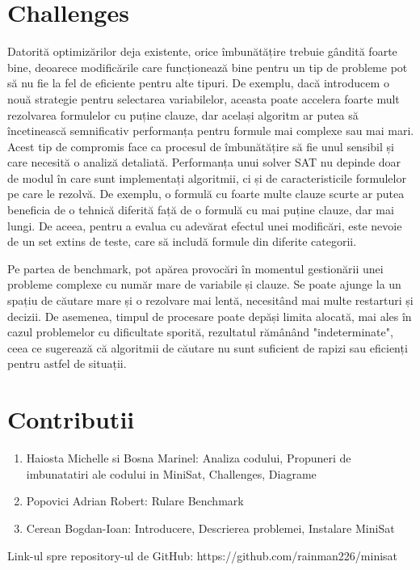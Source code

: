 \documentclass[runningheads]{llncs}
\begin{document}
\section{Challenges}
Datorită optimizărilor deja existente, orice îmbunătățire trebuie gândită foarte bine, deoarece modificările care funcționează bine pentru un tip de probleme pot să nu fie la fel de eficiente pentru alte tipuri. De exemplu, dacă introducem o nouă strategie pentru selectarea variabilelor, aceasta poate accelera foarte mult rezolvarea formulelor cu puține clauze, dar același algoritm ar putea să încetinească semnificativ performanța pentru formule mai complexe sau mai mari. Acest tip de compromis face ca procesul de îmbunătățire să fie unul sensibil și care necesită o analiză detaliată. Performanța unui solver SAT nu depinde doar de modul în care sunt implementați algoritmii, ci și de caracteristicile formulelor pe care le rezolvă. De exemplu, o formulă cu foarte multe clauze scurte ar putea beneficia de o tehnică diferită față de o formulă cu mai puține clauze, dar mai lungi. De aceea, pentru a evalua cu adevărat efectul unei modificări, este nevoie de un set extins de teste, care să includă formule din diferite categorii.

Pe partea de benchmark, pot apărea provocări în momentul gestionării unei probleme complexe cu număr mare de variabile și clauze. Se poate ajunge la un spațiu de căutare mare și o rezolvare mai lentă, necesitând mai multe restarturi și decizii. De asemenea, timpul de procesare poate depăși limita alocată, mai ales în cazul problemelor cu dificultate sporită, rezultatul rămânând "indeterminate", ceea ce sugerează că algoritmii de căutare nu sunt suficient de rapizi sau eficienți pentru astfel de situații.

\newpage


\section{Contributii}
\begin{enumerate}
    \item Haiosta Michelle si Bosna Marinel: Analiza codului, Propuneri de imbunatatiri ale codului in MiniSat, Challenges, Diagrame
    \item Popovici Adrian Robert: Rulare Benchmark
    \item Cerean Bogdan-Ioan: Introducere, Descrierea problemei, Instalare MiniSat
\end{enumerate}

Link-ul spre repository-ul de GitHub: https://github.com/rainman226/minisat
\end{document}
